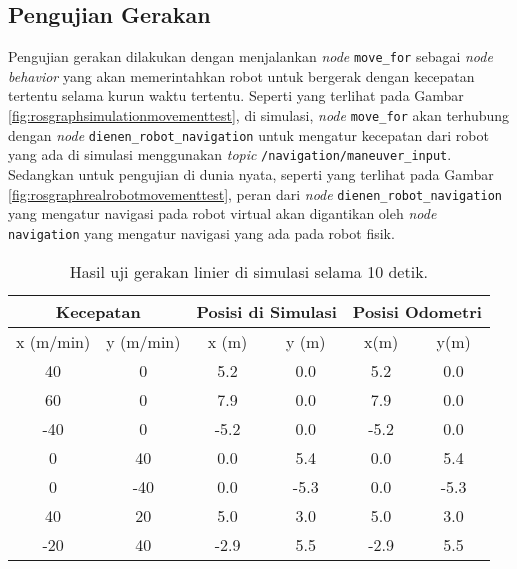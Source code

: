 \subsection{Pengujian Gerakan}
\label{subsec:movementtesting}




Pengujian gerakan dilakukan dengan menjalankan \emph{node} \lstinline{move_for} sebagai \emph{node behavior} yang akan memerintahkan robot untuk bergerak dengan kecepatan tertentu selama kurun waktu tertentu.
Seperti yang terlihat pada Gambar \ref{fig:rosgraphsimulationmovementtest},
  di simulasi,
  \emph{node} \lstinline{move_for} akan terhubung dengan \emph{node} \lstinline{dienen_robot_navigation} untuk mengatur kecepatan dari robot yang ada di simulasi menggunakan \emph{topic} \lstinline{/navigation/maneuver_input}.
Sedangkan untuk pengujian di dunia nyata, seperti yang terlihat pada Gambar \ref{fig:rosgraphrealrobotmovementtest},
  peran dari \emph{node} \lstinline{dienen_robot_navigation} yang mengatur navigasi pada robot virtual akan digantikan oleh \emph{node} \lstinline{navigation} yang mengatur navigasi yang ada pada robot fisik.

\begin{table}
  \caption{Hasil uji gerakan linier di simulasi selama 10 detik.}
  \label{tab:simulationlineartestresults}
  \centering
  \begin{tabular}{cc|cc|cc}
    \toprule
    \multicolumn{2}{c|}{Kecepatan} &
    \multicolumn{2}{|c|}{Posisi di Simulasi} &
    \multicolumn{2}{|c}{Posisi Odometri} \\
    \midrule
    x (m/min) & y (m/min) & x (m) & y (m) & x(m)  & y(m) \\
    \midrule
    40        & 0         & 5.2   & 0.0   & 5.2   & 0.0 \\
    60        & 0         & 7.9   & 0.0   & 7.9   & 0.0 \\
    -40       & 0         & -5.2  & 0.0   & -5.2  & 0.0 \\
    0         & 40        & 0.0   & 5.4   & 0.0   & 5.4 \\
    0         & -40       & 0.0   & -5.3  & 0.0   & -5.3 \\
    40        & 20        & 5.0   & 3.0   & 5.0   & 3.0 \\
    -20       & 40        & -2.9  & 5.5   & -2.9  & 5.5 \\
    \bottomrule
  \end{tabular}
\end{table}

